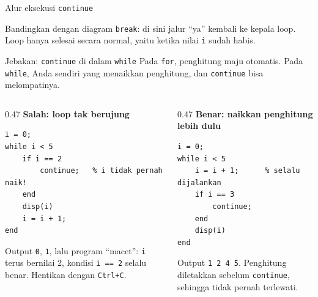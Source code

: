 \documentclass[aspectratio=169,10pt]{beamer}
\newcommand{\codesize}{\footnotesize}
\newcommand{\kode}[1]{\texttt{#1}}
\begin{document}
\begin{frame}[fragile]{Alur eksekusi \kode{continue}}
  \centering

  \vspace{8pt}
  \raggedright
  Bandingkan dengan diagram \kode{break}: di sini jalur ``ya'' \alert{kembali ke kepala loop}.
  Loop hanya selesai secara normal, yaitu ketika nilai \kode{i} sudah habis.
\end{frame}

\begin{frame}[fragile]{Jebakan: \kode{continue} di dalam \kode{while}}
  \renewcommand{\codesize}{\scriptsize}
  Pada \kode{for}, penghitung maju otomatis. Pada \kode{while}, \alert{Anda sendiri} yang menaikkan
  penghitung, dan \kode{continue} bisa melompatinya.
  \vspace{4pt}
  \begin{columns}[T]
    \begin{column}{0.47\textwidth}
      \textcolor{alertc}{\textbf{Salah: loop tak berujung}}
\begin{lstlisting}
i = 0;
while i < 5
    if i == 2
        continue;   % i tidak pernah naik!
    end
    disp(i)
    i = i + 1;
end
\end{lstlisting}
      \footnotesize
      Output \kode{0}, \kode{1}, lalu program ``macet'': \kode{i} terus bernilai 2, kondisi \kode{i == 2} selalu
      benar. Hentikan dengan \kode{Ctrl+C}.
    \end{column}
    \begin{column}{0.47\textwidth}
      \textcolor{okc}{\textbf{Benar: naikkan penghitung lebih dulu}}
\begin{lstlisting}
i = 0;
while i < 5
    i = i + 1;      % selalu dijalankan
    if i == 3
        continue;
    end
    disp(i)
end
\end{lstlisting}
      \footnotesize
      Output \kode{1 2 4 5}. Penghitung diletakkan \alert{sebelum} \kode{continue}, sehingga tidak
      pernah terlewati.
    \end{column}
  \end{columns}
\end{frame}
\end{document}
